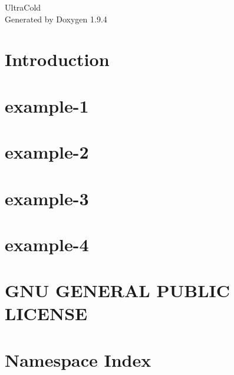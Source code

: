 \documentclass[twoside]{book}
\newcommand{\+}{\discretionary{\mbox{\scriptsize$\hookleftarrow$}}{}{}}
\newcommand{\clearemptydoublepage}{%
    \newpage{\pagestyle{empty}\cleardoublepage}%
  }
\begin{document}
  \raggedbottom
    \hypersetup{pageanchor=false,
                bookmarksnumbered=true,
                pdfencoding=unicode
               }
  \begin{titlepage}
  \vspace*{7cm}
  \begin{center}%
  {\Large Ultra\+Cold}\\
  \vspace*{1cm}
  {\large Generated by Doxygen 1.9.4}\\
  \end{center}
  \end{titlepage}
  \clearemptydoublepage
  \tableofcontents
  \clearemptydoublepage
  \hypersetup{pageanchor=true}
\chapter{Introduction}
\label{index}\hypertarget{index}{}
\chapter{example-\/1}
\label{example-1}

\chapter{example-\/2}
\label{example-2}

\chapter{example-\/3}
\label{example-3}

\chapter{example-\/4}
\label{example-4}

\chapter{GNU GENERAL PUBLIC LICENSE}
\label{md__home_smroccuzzo_work__ultra_cold__l_i_c_e_n_s_e}

\chapter{Namespace Index}

\end{document}
